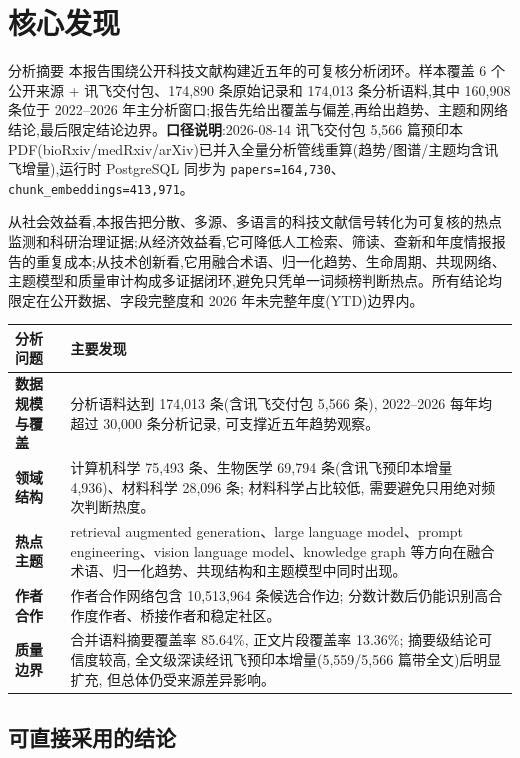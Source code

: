 \section{核心发现}

\begin{reportbox}{分析摘要}
本报告围绕公开科技文献构建近五年的可复核分析闭环。样本覆盖 6 个公开来源 + 讯飞交付包、174,890 条原始记录和 174,013 条分析语料,其中 160,908 条位于 2022--2026 年主分析窗口;报告先给出覆盖与偏差,再给出趋势、主题和网络结论,最后限定结论边界。\textbf{口径说明}:2026-08-14 讯飞交付包 5{,}566 篇预印本 PDF(bioRxiv/medRxiv/arXiv)已并入全量分析管线重算(趋势/图谱/主题均含讯飞增量),运行时 PostgreSQL 同步为 \texttt{papers=164{,}730}、\texttt{chunk\_embeddings=413{,}971}。

从社会效益看,本报告把分散、多源、多语言的科技文献信号转化为可复核的热点监测和科研治理证据;从经济效益看,它可降低人工检索、筛读、查新和年度情报报告的重复成本;从技术创新看,它用融合术语、归一化趋势、生命周期、共现网络、主题模型和质量审计构成多证据闭环,避免只凭单一词频榜判断热点。所有结论均限定在公开数据、字段完整度和 2026 年未完整年度(YTD)边界内。
\end{reportbox}

\begin{tableblock}
\begin{tabularx}{\textwidth}{>{\bfseries}p{34mm}X}
\toprule
分析问题 & 主要发现 \\
\midrule
数据规模与覆盖 & 分析语料达到 174,013 条(含讯飞交付包 5,566 条), 2022--2026 每年均超过 30,000 条分析记录, 可支撑近五年趋势观察。 \\
领域结构 & 计算机科学 75,493 条、生物医学 69,794 条(含讯飞预印本增量 4,936)、材料科学 28,096 条; 材料科学占比较低, 需要避免只用绝对频次判断热度。 \\
热点主题 & retrieval augmented generation、large language model、prompt engineering、vision language model、knowledge graph 等方向在融合术语、归一化趋势、共现结构和主题模型中同时出现。 \\
作者合作 & 作者合作网络包含 10,513,964 条候选合作边; 分数计数后仍能识别高合作度作者、桥接作者和稳定社区。 \\
质量边界 & 合并语料摘要覆盖率 85.64\%, 正文片段覆盖率 13.36\%; 摘要级结论可信度较高, 全文级深读经讯飞预印本增量(5,559/5,566 篇带全文)后明显扩充, 但总体仍受来源差异影响。 \\
\bottomrule
\end{tabularx}
\end{tableblock}

\subsection{可直接采用的结论}


